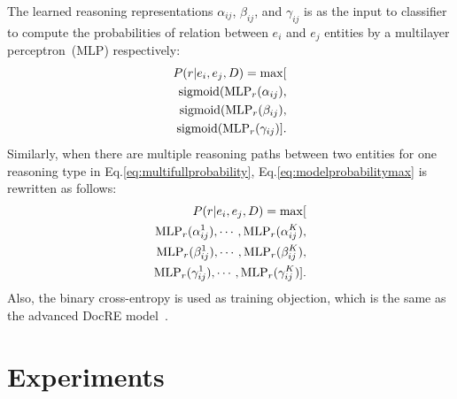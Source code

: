 \documentclass[11pt,a4paper]{article}
\begin{document}
The learned reasoning representations $\alpha_{ij}$, $\beta_{ij}$, and $\gamma_{ij}$ is as the input to classifier to compute the probabilities of relation between $e_i$ and $e_j$ entities by a multilayer perceptron~(MLP) respectively:
\begin{equation}
\begin{aligned}
P(r|e_i,e_j,D)=\max[\\
\textup{sigmoid}(\textup{MLP}_r(\alpha_{ij}), \\
\textup{sigmoid}(\textup{MLP}_r(\beta_{ij}), \\
\textup{sigmoid}(\textup{MLP}_r(\gamma_{ij})].
\label{eq:modelprobabilitymax}
\end{aligned}
\end{equation}
Similarly, when there are multiple reasoning paths between two entities for one reasoning type in Eq.\ref{eq:multifullprobability}, Eq.\ref{eq:modelprobabilitymax} is rewritten as follows:
\begin{equation}
\begin{aligned}
P(r|e_i,e_j,D)=\max[\\
\textup{MLP}_r(\alpha^{1}_{ij}),\cdots,\textup{MLP}_r(\alpha^{K}_{ij}),\\
\textup{MLP}_r(\beta^{1}_{ij}),\cdots,\textup{MLP}_r(\beta^{K}_{ij}),\\
\textup{MLP}_r(\gamma^{1}_{ij}),\cdots,\textup{MLP}_r(\gamma^{K}_{ij})].
\label{eq:fullmodelprobability}
\end{aligned}
\end{equation}
Also, the binary cross-entropy is used as training objection, which is the same as the advanced DocRE model~\cite{yao-etal-2019-docred}.

\section{Experiments}
\label{sec4}
\end{document}
